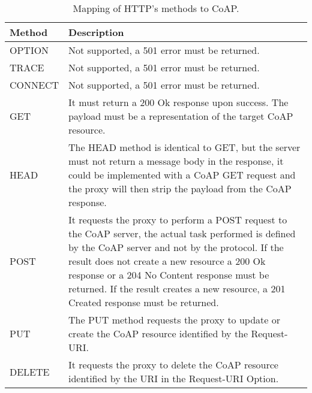 	\begin{table}[h!]
		\begin{center}
			\begin{tabularx}{\textwidth}{|l|X|}
				\hline
				\textbf{Method} & \textbf{Description} \\\hline
				OPTION & Not supported, a 501 error must be returned.\\\hline
				TRACE & Not supported, a 501 error must be returned.\\\hline
				CONNECT & Not supported, a 501 error must be returned.\\\hline
				GET & It must return a 200 Ok response upon success.
				The payload must be a representation of the target CoAP resource.\\\hline
				HEAD & The HEAD method is identical to GET, but the server must not return a message body in the response, it could be implemented with a CoAP GET request and the proxy will then strip the payload from the CoAP response.\\\hline
				POST & It requests the proxy to perform a POST request to the CoAP server, the actual task performed is defined by the CoAP server and not by the protocol.
				If the result does not create a new resource a 200 Ok response or a 204 No Content response must be returned.
				If the result creates a new resource, a 201 Created response must be returned.\\\hline
				PUT & The PUT method requests the proxy to update or create the CoAP resource identified by the Request-URI.\\\hline
				DELETE & It requests the proxy to delete the CoAP resource identified by the URI in the Request-URI Option.\\\hline
				
			\end{tabularx}
			\caption{Mapping of HTTP's methods to CoAP.}
			\label{tab:table9}
		\end{center}
	\end{table}